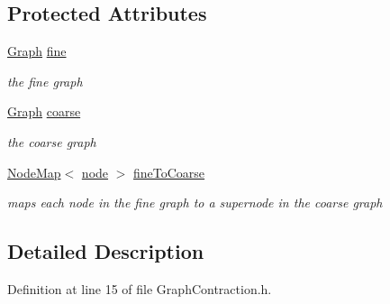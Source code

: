 \subsection*{Protected Attributes}
\begin{DoxyCompactItemize}
\item 
\hyperlink{class_ensemble_clustering_1_1_graph}{Graph} \hyperlink{class_ensemble_clustering_1_1_graph_contraction_a5fd6c5e554f4ae2a33537d6e0123deda}{fine}
\begin{DoxyCompactList}\small\item\em the fine graph \end{DoxyCompactList}\item 
\hyperlink{class_ensemble_clustering_1_1_graph}{Graph} \hyperlink{class_ensemble_clustering_1_1_graph_contraction_aa1d4ff053c718f52c97c1d30492a9eeb}{coarse}
\begin{DoxyCompactList}\small\item\em the coarse graph \end{DoxyCompactList}\item 
\hyperlink{class_ensemble_clustering_1_1_node_map}{Node\-Map}$<$ \hyperlink{namespace_ensemble_clustering_ae829290aeccd1a420b17a37fd901f114}{node} $>$ \hyperlink{class_ensemble_clustering_1_1_graph_contraction_a32c7c2bc182c687a1c5fffaf715f6541}{fine\-To\-Coarse}
\begin{DoxyCompactList}\small\item\em maps each node in the fine graph to a supernode in the coarse graph \end{DoxyCompactList}\end{DoxyCompactItemize}


\subsection{Detailed Description}


Definition at line 15 of file Graph\-Contraction.\-h.



